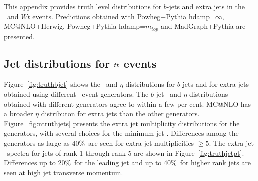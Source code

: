 This appendix provides  truth level distributions for $b$-jets and extra jets in 
the \ttbar\ and $Wt$ events.  Predictions obtained with {\sc Powheg+Pythia} hdamp=$\infty$, 
{\sc MC@NLO+Herwig}, {\sc Powheg+Pythia} hdamp=$m_{top}$ and  {\sc MadGraph+Pythia} are presented.
\subsection{Jet distributions for $t\bar{t}$ events}
Figure~\ref{fig:truthbjet} shows the \pt\ and $\eta$ distributions for $b$-jets and for extra jets obtained
using different \ttbar\  event generators.  
The $b$-jet \pt\ and $\eta$ distributions obtained with different generators agree to within a few per cent.  
MC@NLO has a broader $\eta$ distributon for extra jets than the other generators.
Figure~\ref{fig:ntruthjets} presents the extra jet multiplicity
distributions for the generators, with several choices for the minimum jet \pt.
Differences among the generators as large as 40\%\  are seen for
extra jet multiplicities $\ge 5$.  
The extra jet \pt\ spectra for jets of rank 1 through rank 5 are shown in Figure~\ref{fig:truthjetpt}.
Differences up to 20\%\ for the leading jet and up to 40\%\ for higher rank jets are seen at high jet transverse
momentum.

